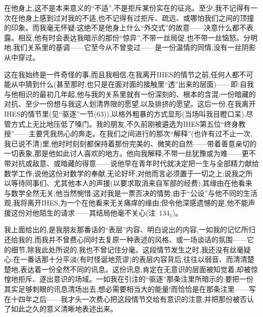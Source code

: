 在他身上,这不是本来意义的“不适”,不是拒斥某份实在的征兆。至少,我不记得有一次在他身上感到过对我的不适,也不记得有过拒斥、疏远、或哪怕我们之间的顶撞的印象。而我毫无怀疑:这绝不是他身上什么“外交式”的故意——决意什么都不表露。相反,他有时会表达我暗示的那份“惊异”,不带一丝局促,也不带一丝恼怒。分明地,我们关系里的基调——它至今\dmark{}从不曾变过——是一份温情的同情,没有一丝阴影从中穿过。

这在我始终是一件奇怪的事,而且我相信,在我离开IHES的情节之前,任何人都不可能从中猜到什么(甚至那时,也只是在面对面的接触里“透”出来的层面)——即:自我与他相识的最初几年起,他与我的关系里就有一份深刻的、根本的含混:一份暗藏的对抗、至少一份想与我这人划清界限的愿望,以及排挤的愿望。这后一份,在我离开IHES的情节里(见“驱逐”一节(63)),以格外粗暴的方式显形(当场叫我目瞪口呆),尽管方式上无比地压低了嗓门。我的朋友,不久前刚被遴选为IHES第五位“终身教授”——主要凭我热心的奔走。在我们之间进行的那次“解释”(也许有过不止一次,我已说不清)里,他时时刻刻都保持着那份完美的、微笑的自然——带着善意亲切的一切表象,那是他如此讨人喜欢的地方。他向我解释,不带一丝犹豫或为难——更不带对抗或敌意、或暗藏的得意——说他早在青年时代就决定把一生与全部精力献给数学工作;说他这份对数学的奉献,无论好坏,对他而言必须置于一切之上;说我之所以等待同事们、尤其他本人的声援(以要求取消来自军部的经费),其缘由在他看来与数学全然无关;他当然惋惜:这对我是一票否决的情势,由于“公设”与他不同的生活观,我将离开IHES,为一个在他看来无关痛痒的缘由;但令他深感遗憾的是,他不能声援这份对他陌生的请求——其结局他毫不关心(注~134$_{1}$)。

我上面给出的,是我朋友那番话的“表层”内容、明白说出的内容,一如我的记忆所归还给我的,而我并不曾费心同时去复原一种表述的风格、或一场谈话的氛围——它的细节,除我此处所说的,我也不曾记住分毫。这段情节发生之时,我还没有丝毫疑心:在一番话那十分平淡(有时怪诞地荒谬)的表层内容背后,往往以弱音\dmark{}、而清清楚楚地,表达着一份全然不同的讯息。这份讯息,肯定在无意识的层面被知觉着,却被惊惶地拒斥、逐出意识的场域。一如我在引注的“驱逐”那条注里所暗示的:要把一份其实足够刺眼的讯息清场出去,想必需要相当大的能量!而恰恰是在那条注里——写在十四年之后——我才头一次费心把这段情节交给有意识的注意,并把那份被否认了如此之久的意义清晰地表述出来。


